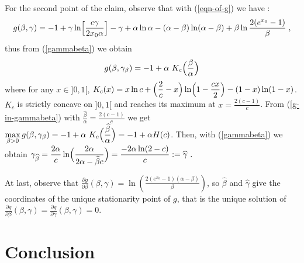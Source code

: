 \documentclass[aop,noinfoline]{imsart}
\renewcommand{\Box}{{\vrule width0.6ex height1em depth0cm}}
\newenvironment{proof}{\noindent{\bf Proof:}}{\hfill \Box}
\renewcommand{\hat}{\widehat}
\begin{document}
\begin{proof}
 For the second point of the claim, observe that with  (\ref{eqn-of-g}) we have :
$$g(\beta, \gamma)=  -1 +\gamma\ln \Bigl [\frac{c \gamma}{2x_0\alpha}\Bigr ] -\gamma + 
 \alpha\ln\alpha-(\alpha-\beta)\ln(\alpha-\beta)+ 
 \beta\ln \frac{2(e^{x_0}-1)}{\beta}\;,$$
 thus from (\ref{gammabeta}) we obtain 
 \begin{equation}\label{g-in-gammabeta}
 g(\beta, \gamma_{\beta})= -1+ \alpha  \  K_c \Bigl ( \frac{\beta}{\alpha} \Bigr ) 
 \end{equation} 
 where for any  $x\in ]0,1[$, $\displaystyle K_c(x)= x\ln c + \Bigl (\frac{2}{c} -x  \Bigr ) \ln \Bigl ( 1- \frac{cx}{2} \Bigr ) -  (1 -x ) \ln  ( 1- x)$.
  $K_c$ is strictly concave on $]0,1[$ and reaches its maximum at $\displaystyle x= \frac{2(c-1)}{c}$. From (\ref{g-in-gammabeta}) with $\displaystyle \frac{\hat\beta}{\alpha} =  \frac{2(c-1)}{c}$ we get 
$\displaystyle\max_{\beta>0} g(\beta,\gamma_{\beta}) = -1+ \alpha  \  K_c \Bigl ( \frac{\hat\beta}{\alpha} \Bigr )= -1+ \alpha H(c)$. Then, with (\ref{gammabeta}) we obtain $\displaystyle \gamma_{\hat\beta}= \frac{2\alpha}{c}\ln \Bigl ( \frac{ 2\alpha}{2\alpha - \hat\beta c}\Bigr )= \frac{-2\alpha\ln (2-c)}{c}:=\hat\gamma\ .$  

At last, observe that  $\displaystyle \frac{ \partial g}{\partial\beta} (\beta, \gamma)= \ln\left (\frac{2(e^{x_0}-1)(\alpha-\beta)}{\beta} \right )$, so 
       $\hat\beta$ and  $
 \hat\gamma$ give the coordinates of the unique stationarity point of $g$, that is the unique solution of
  $\displaystyle  \frac{ \partial g}{\partial\beta}(\beta, \gamma)=
  \frac{ \partial g}{\partial\gamma}(\beta, \gamma)=0$.
 \\


\end{proof}



 \section{Conclusion}
 
\end{document}
